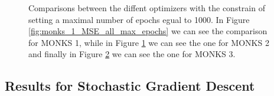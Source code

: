 \begin{figure}[t!]
\begin{subfigure}{0.45\textwidth}
                    \caption{}
                    \label{fig:monks_2_MSE_all_max_epochs}
                \end{subfigure}
                \begin{subfigure}{0.45\textwidth}
                    \caption{}
                    \label{fig:monks_3_MSE_all_max_epochs}
                \end{subfigure}
                \caption{Comparisons between the diffent optimizers with the constrain of setting a
                maximal number of epochs egual to 1000. In Figure \ref{fig:monks_1_MSE_all_max_epochs}
                we can see the comparison for MONKS 1, while in Figure \ref{fig:monks_2_MSE_all_max_epochs}
                we can see the one for MONKS 2 and finally in Figure \ref{fig:monks_3_MSE_all_max_epochs} we
                can see the one for MONKS 3.}
                \label{fig:monks_MSE_all_max_epochs}
            \end{figure}


        \subsection{Results for Stochastic Gradient Descent} %
        \label{sub:results_for_stochastic_gradient_descent}

